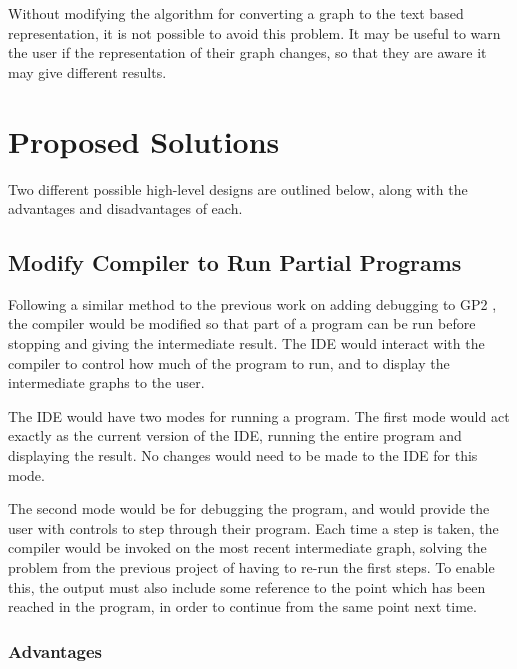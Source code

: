 \documentclass[authoryearcitations]{UoYCSproject}
\begin{document}
Without modifying the algorithm for converting a graph to the text based
representation, it is not possible to avoid this problem. It may be
useful to warn the user if the representation of their graph changes, so that
they are aware it may give different results.


\section{Proposed Solutions}
\label{sec:ProposedSolutions}

Two different possible high-level designs are outlined below, along with the
advantages and disadvantages of each.


\subsection{Modify Compiler to Run Partial Programs}
\label{sec:ProposedDesign1}

Following a similar method to the previous work on adding debugging to GP2
\citep{taylor2016}, the compiler would be modified so that part of a program
can be run before stopping and giving the intermediate result. The IDE would
interact with the compiler to control how much of the program to run, and to
display the intermediate graphs to the user.

The IDE would have two modes for running a program. The first mode would act
exactly as the current version of the IDE, running the entire program and
displaying the result. No changes would need to be made to the IDE for this mode.

The second mode would be for debugging the program, and would provide the user
with controls to step through their program. Each time a step is taken, the
compiler would be invoked on the most recent intermediate graph, solving the
problem from the previous project of having to re-run the first steps. To
enable this, the output must also include some reference to the point which has
been reached in the program, in order to continue from the same point next time.


\subsubsection{Advantages}
\label{sec:ProposedDesign1Advantages}
\end{document}
